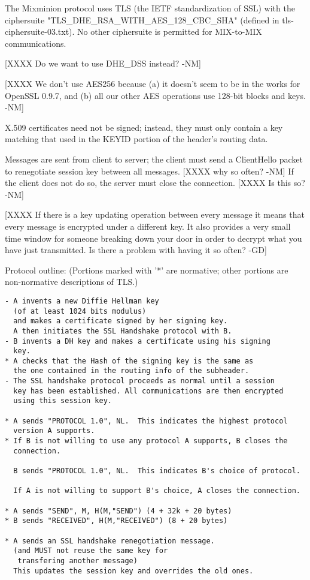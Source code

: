 The Mixminion protocol uses TLS (the IETF standardization of SSL) with
the ciphersuite "TLS_DHE_RSA_WITH_AES_128_CBC_SHA" (defined in
tls-ciphersuite-03.txt).  No other ciphersuite is permitted for
MIX-to-MIX communications.

  [XXXX Do we want to use DHE_DSS instead? -NM]

  [XXXX We don't use AES256 because (a) it doesn't seem to be in
        the works for OpenSSL 0.9.7, and (b) all our other AES
        operations use 128-bit blocks and keys. -NM]

X.509 certificates need not be signed; instead, they must only contain
a key matching that used in the KEYID portion of the header's routing
data.  

Messages are sent from client to server; the client must send a
ClientHello packet to renegotiate session key between all
messages. [XXXX why so often? -NM] If the client does not do so, the
server must close the connection.  [XXXX Is this so? -NM]

[XXXX If there is a key updating operation between every message it means
that every message is encrypted under a different key. It also
provides a very small time window for someone breaking down your door
in order to decrypt what you have just transmitted. Is there a problem
with having it so often? -GD]

Protocol outline: (Portions marked with '*' are normative; other
portions are non-normative descriptions of TLS.)

\begin{verbatim}
- A invents a new Diffie Hellman key 
  (of at least 1024 bits modulus)
  and makes a certificate signed by her signing key.
  A then initiates the SSL Handshake protocol with B.
- B invents a DH key and makes a certificate using his signing
  key.
* A checks that the Hash of the signing key is the same as
  the one contained in the routing info of the subheader.
- The SSL handshake protocol proceeds as normal until a session
  key has been established. All communications are then encrypted
  using this session key.

* A sends "PROTOCOL 1.0", NL.  This indicates the highest protocol
  version A supports.
* If B is not willing to use any protocol A supports, B closes the 
  connection.

  B sends "PROTOCOL 1.0", NL.  This indicates B's choice of protocol.

  If A is not willing to support B's choice, A closes the connection.
  
* A sends "SEND", M, H(M,"SEND") (4 + 32k + 20 bytes)
* B sends "RECEIVED", H(M,"RECEIVED") (8 + 20 bytes)

* A sends an SSL handshake renegotiation message.
  (and MUST not reuse the same key for 
   transfering another message)
  This updates the session key and overrides the old ones.
\end{verbatim}

